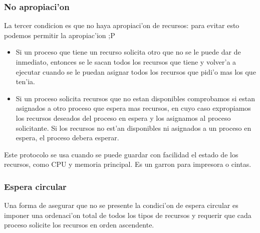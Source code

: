 \subsubsection{No apropiaci'on}
La tercer condicion es que no haya apropiaci'on de recursos: para evitar esto podemos permitir la apropiac'ion ;P
\begin{itemize}
 \item Si un proceso que tiene un recurso solicita otro que no se le puede dar de inmediato, entonces se le sacan todos los recursos que tiene y volver'a a ejecutar cuando se le puedan asignar todos los recursos que pidi'o mas los que ten'ia.
 \item Si un proceso solicita recursos que no estan disponibles comprobamos si estan asignados a otro proceso que espera mas recursos, en cuyo caso expropiamos los recursos deseados del proceso en espera y los asignamos al proceso solicitante. Si los recursos no est'an disponibles ni asignados a un proceso en espera, el proceso debera esperar.
\end{itemize}
Este protocolo se usa cuando se puede guardar con facilidad el estado de los recursos, como CPU y memoria principal. Es un garron para impresora o cintas.

\subsubsection{Espera circular}
Una forma de asegurar que no se presente la condici'on de espera circular es imponer una ordenaci'on total de todos los tipos de recursos y requerir que cada proceso solicite los recursos en orden ascendente.

